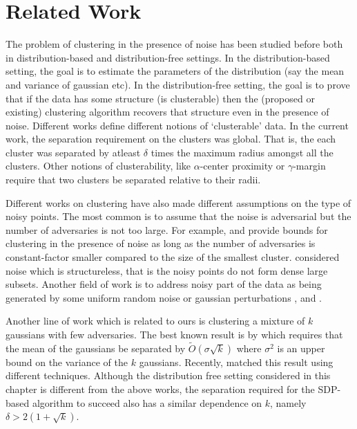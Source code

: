 \documentclass[12pt]{article}
\begin{document}
\section{Related Work}
The problem of clustering in the presence of noise has been studied before both in distribution-based and distribution-free settings. In the distribution-based setting, the goal is to estimate the parameters of the distribution (say the mean and variance of gaussian etc). In the distribution-free setting, the goal is to prove that if the data has some structure (is clusterable) then the (proposed or existing) clustering algorithm recovers that structure even in the presence of noise. Different works define different notions of `clusterable' data. In the current work, the separation requirement on the clusters was global. That is, the each cluster was separated by atleast $\delta$ times the maximum radius amongst all the clusters. Other notions of clusterability, like $\alpha$-center proximity \cite{awasthi2012center}or $\gamma$-margin \cite{ashtiani2016clustering} require that two clusters be separated relative to their radii.

Different works on clustering have also made different assumptions on the type of noisy points. The most common is to assume that the noise is adversarial but the number of adversaries is not too large. For example, \cite{balcan2012clustering} and \cite{balcan2008discriminative} provide bounds for clustering in the presence of noise as long as the number of adversaries is constant-factor smaller compared to the size of the smallest cluster. \cite{kushagra2016finding} considered noise which is structureless, that is the noisy points do not form dense large subsets. Another field of work is to address noisy part of the data as being generated by some uniform random noise or gaussian perturbations \cite{cuesta1997trimmed}, \cite{garcia2008general} and \cite{dave1993robust}.  

Another line of work which is related to ours is clustering a mixture of $k$ gaussians with few adversaries. The best known result is by \cite{awasthi2012improved} which requires that the mean of the gaussians be separated by $\tilde O(\sigma \sqrt{k})$ where $\sigma^2$ is an upper bound on the variance of the $k$ gaussians. Recently, \cite{charikar2017learning} matched this result using different techniques. Although the distribution free setting considered in this chapter is different from the above works, the separation required for the SDP-based algorithm to succeed also has a similar dependence on $k$, namely $\delta > 2(1 + \sqrt{k})$. 
\end{document}
